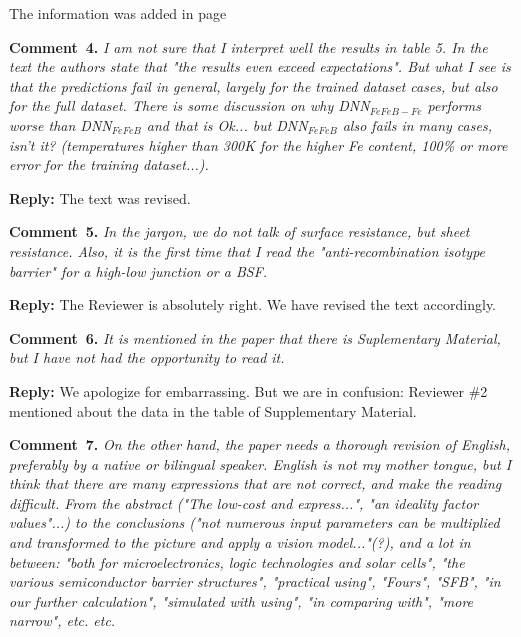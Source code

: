 \documentclass[num-refs]{wiley-article} %
\begin{document}
The information was added in page


\vspace{1cm}
\noindent
\textcolor[rgb]{0.00,0.50,1.00}{\textbf{Comment~4.}}
\emph{I am not sure that I interpret well the results in table 5.
In the text the authors state that "the results even exceed expectations".
But what I see is that the predictions fail in general, largely for the trained dataset cases, but also for the full dataset.
There is some discussion on why DNN$_{FeFeB-Fe}$ performs worse than DNN$_{FeFeB}$ and that is Ok... but DNN$_{FeFeB}$ also fails in many cases, isn't it?
(temperatures higher than 300K for the higher Fe content, 100\% or more error for the training dataset...).
}

\vspace{0.5cm}
\noindent
\textcolor[rgb]{0.51,0.00,0.00}{\textbf{Reply:}}
The text was revised.

\vspace{1cm}
\noindent
\textcolor[rgb]{0.00,0.50,1.00}{\textbf{Comment~5.}}
\emph{In the jargon, we do not talk of surface resistance, but sheet resistance.
Also, it is the first time that I read the "anti-recombination isotype barrier" for a high-low junction or a BSF.}

\vspace{0.5cm}
\noindent
\textcolor[rgb]{0.51,0.00,0.00}{\textbf{Reply:}}
The Reviewer is absolutely right.
We have revised the text accordingly. 

\vspace{1cm}
\noindent
\textcolor[rgb]{0.00,0.50,1.00}{\textbf{Comment~6.}}
\emph{It is mentioned in the paper that there is Suplementary Material, but I have not had the opportunity to read it.}

\vspace{0.5cm}
\noindent
\textcolor[rgb]{0.51,0.00,0.00}{\textbf{Reply:}}
We apologize for embarrassing.
But we are in confusion:
Reviewer \#2 mentioned about the data in the table of Supplementary Material.


\vspace{1cm}
\noindent
\textcolor[rgb]{0.00,0.50,1.00}{\textbf{Comment~7.}}
\emph{On the other hand, the paper needs a thorough revision of English, preferably by a native or bilingual speaker.
English is not my mother tongue, but I think that there are many expressions that are not correct, and make the reading difficult.
From the abstract ("The low-cost and express...", "an ideality factor values"...)
to the conclusions ("not numerous input parameters can be multiplied and transformed to the picture and apply a vision model..."(?),
and a lot in between: "both for microelectronics, logic technologies and solar cells",
"the various semiconductor barrier structures", "practical using", "Fours", "SFB", "in our further calculation",
"simulated with using", "in comparing with", "more narrow", etc. etc. }
\end{document}
